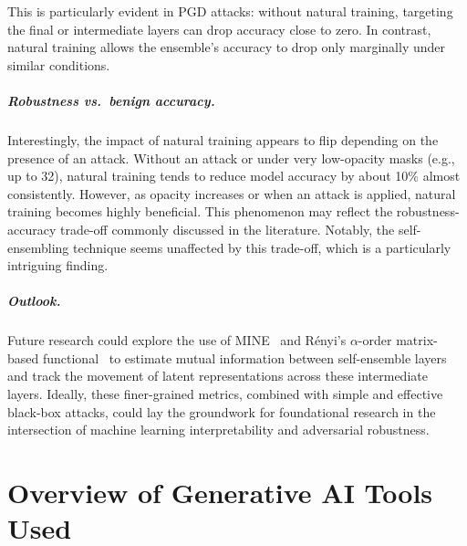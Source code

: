 \documentclass[a4paper, oneside]{discothesis}
\begin{document}
This is particularly evident in PGD attacks: without natural training, targeting the final or intermediate layers can drop accuracy close to zero. In contrast, natural training allows the ensemble's accuracy to drop only marginally under similar conditions.

\paragraph{Robustness vs.\ benign accuracy.}

Interestingly, the impact of natural training appears to flip depending on the presence of an attack. Without an attack or under very low-opacity masks (e.g., up to 32), natural training tends to reduce model accuracy by about 10\% almost consistently. However, as opacity increases or when an attack is applied, natural training becomes highly beneficial. This phenomenon may reflect the robustness-accuracy trade-off commonly discussed in the literature. Notably, the self-ensembling technique seems unaffected by this trade-off, which is a particularly intriguing finding.

\paragraph{Outlook.}

Future research could explore the use of MINE~\cite{pmlr-v80-belghazi18a} and Rényi's $\alpha$-order matrix-based functional~\cite{6954500} to estimate mutual information between self-ensemble layers and track the movement of latent representations across these intermediate layers. Ideally, these finer-grained metrics, combined with simple and effective black-box attacks, could lay the groundwork for foundational research in the intersection of machine learning interpretability and adversarial robustness.










\bigskip



\appendix


\chapter*{Overview of Generative AI Tools Used}
\end{document}
